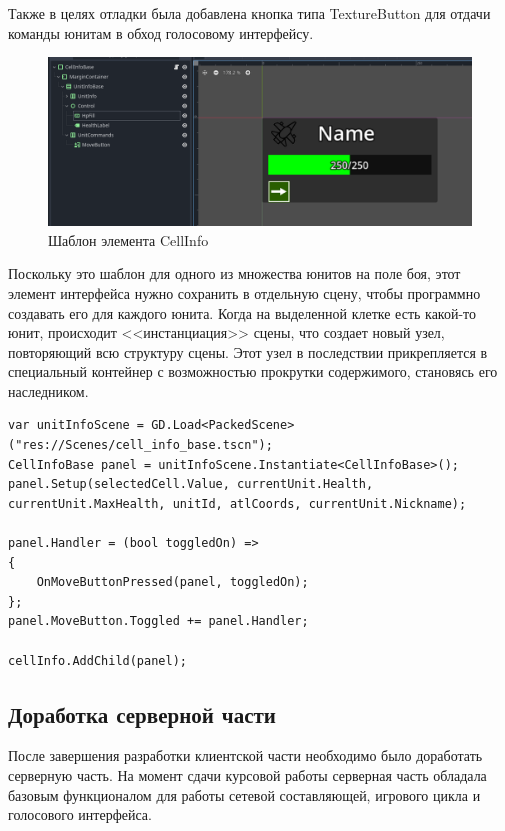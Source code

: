             Также в целях отладки была добавлена кнопка типа TextureButton для отдачи команды юнитам в обход голосовому интерфейсу.
            

            \begin{figure}[H]
                \centering
                \includegraphics[width=\textwidth]{pictures/cellinfobase.png}
                \caption{Шаблон элемента CellInfo}\label{ris2.5}
            \end{figure}

            Поскольку это шаблон для одного из множества юнитов на поле боя, этот элемент интерфейса нужно сохранить в отдельную сцену, чтобы программно создавать его для каждого юнита.
            Когда на выделенной клетке есть какой-то юнит, происходит <<инстанциация>> сцены, что создает новый узел, повторяющий всю структуру сцены. Этот узел в последствии прикрепляется в
            специальный контейнер с возможностью прокрутки содержимого, становясь его наследником.
            \begin{lstlisting}[caption=Создание экземпляра шаблона]
var unitInfoScene = GD.Load<PackedScene>("res://Scenes/cell_info_base.tscn");
CellInfoBase panel = unitInfoScene.Instantiate<CellInfoBase>();
panel.Setup(selectedCell.Value, currentUnit.Health, currentUnit.MaxHealth, unitId, atlCoords, currentUnit.Nickname);

panel.Handler = (bool toggledOn) =>
{
    OnMoveButtonPressed(panel, toggledOn);
};
panel.MoveButton.Toggled += panel.Handler;

cellInfo.AddChild(panel);
            \end{lstlisting}


    \subsection{Доработка серверной части}

        После завершения разработки клиентской части необходимо было доработать серверную часть. На момент сдачи курсовой работы серверная часть обладала 
        базовым функционалом для работы сетевой составляющей, игрового цикла и голосового интерфейса.

